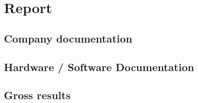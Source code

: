 \documentclass[a4paper,12pt,twoside]{report}
\begin{document}

\part{Report}

\appendix
\chapter{Company documentation}
\chapter{Hardware / Software Documentation}
\chapter{Gross results}
\end{document}
